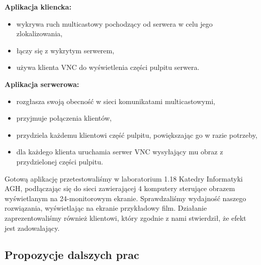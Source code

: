     \textbf{Aplikacja kliencka:}
    \begin{itemize}[noitemsep,nolistsep]
      \item wykrywa ruch multicastowy pochodzący od serwera w celu jego zlokalizowania,
      \item łączy się z wykrytym serwerem,
      \item używa klienta VNC do wyświetlenia części pulpitu serwera.
    \end{itemize}

    \vspace{3mm}

    \textbf{Aplikacja serwerowa:}
    \begin{itemize}[noitemsep,nolistsep]
      \item rozgłasza swoją obecność w sieci komunikatami multicastowymi,
      \item przyjmuje połączenia klientów,
      \item przydziela każdemu klientowi część pulpitu, powiększając go w razie potrzeby,
      \item dla każdego klienta uruchamia serwer VNC wysyłający mu obraz z przydzielonej części pulpitu.
    \end{itemize}

    \vspace{3mm}

    Gotową aplikację przetestowaliśmy w laboratorium 1.18 Katedry Informatyki AGH, podłączając się do sieci zawierającej 4 komputery sterujące obrazem wyświetlanym na 24-monitorowym ekranie. Sprawdzaliśmy wydajność naszego rozwiązania, wyświetlając na ekranie przykładowy film. Działanie zaprezentowaliśmy również klientowi, który zgodnie z nami stwierdził, że efekt jest zadowalający.

  \subsection{Propozycje dalszych prac}

